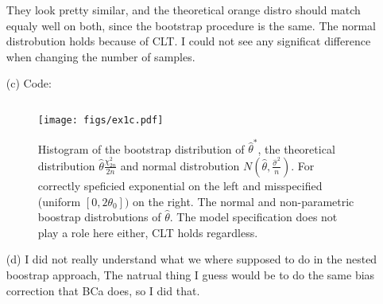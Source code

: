 \documentclass[a4paper,12pt]{article}
\theoremstyle{breaktheorem}
\theoremstyle{exerciseStyle}
\theoremstyle{solutionStyle}
\begin{document}
\begin{enumerate}
\begin{figure}[h]
          \end{figure}

          They look pretty similar, and the theoretical orange distro should match equaly well on both, since
          the bootstrap procedure is the same. The normal distrobution holds because of
          CLT. I could not see any significat difference when changing the number of samples.
          \newpage
    \item[(c)]
          Code:
          \inputminted[linenos, breaklines, frame=lines]{python}{ex1c.py}


          \begin{figure}[h]
              \centering
              \texttt{[image: figs/ex1c.pdf]}
              \caption{Histogram of the bootstrap distribution of $\hat{\theta}^*$,
              the theoretical distribution $\hat \theta \frac{\chi^2_{2n}}{2n} $
              and normal distrobution $N(\hat \theta, \frac{\hat \sigma^2}{n})$.
              For correctly speficied exponential on the left and misspecified (uniform $[0,2 \theta_0])$ on the right.
              The normal and non-parametric boostrap distrobutions of $\hat \theta$.
              The model specification does not play a role here either, CLT holds regardless.}

          \end{figure}

          \newpage
    \item[(d)]
          I did not really understand what we where supposed to do in the nested boostrap approach,
          The natrual thing I guess would be to do the same bias correction that BCa does, so I did that.
          \inputminted[linenos, breaklines, frame=lines]{python}{ex1d.py}


\end{enumerate}
\end{document}
